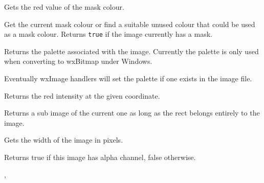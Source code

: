 
Gets the red value of the mask colour.


\label{wximagegetgetorsetmaskcolour}


Get the current mask colour or find a suitable unused colour that could be 
used as a mask colour. Returns {\tt true} if the image currently has a mask.


\label{wximagegetpalette}


Returns the palette associated with the image. Currently the palette is only
used when converting to wxBitmap under Windows.

Eventually wxImage handlers will set the palette if one exists in the image file.


\label{wximagegetred}


Returns the red intensity at the given coordinate.


\label{wximagegetsubimage}


Returns a sub image of the current one as long as the rect belongs entirely to 
the image.


\label{wximagegetwidth}


Gets the width of the image in pixels.




\label{wximagehasalpha}


Returns true if this image has alpha channel, false otherwise.


, 



